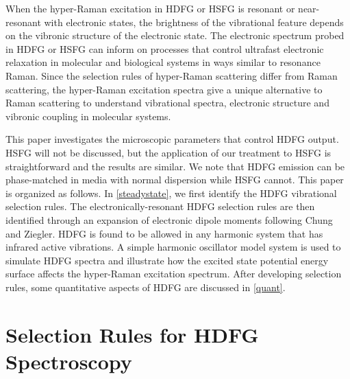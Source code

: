 \documentclass[aip, jcp, reprint, onecolumn, nofootinbib]{revtex4-2}
\begin{document}
When the hyper-Raman excitation in HDFG or HSFG is resonant or near-resonant with electronic states, the brightness of the vibrational feature depends on the vibronic structure of the electronic state.
The electronic spectrum probed in HDFG or HSFG can inform on processes that control ultrafast electronic relaxation in molecular and biological systems in ways similar to resonance Raman.\cite{Cho2001, Bredenbeck2015, Gaynor2018, Arsenault2021}
Since the selection rules of hyper-Raman scattering differ from Raman scattering, the hyper-Raman excitation spectra give a unique alternative to Raman scattering to understand vibrational spectra, electronic structure and vibronic coupling in molecular systems. \cite{Olson2018}

This paper investigates the microscopic parameters that control HDFG output. \cite{RN352, Bonn2024, McDonnell2024}
HSFG will not be discussed, but the application of our treatment to HSFG is straightforward and the results are similar.
We note that HDFG emission can be phase-matched in media with normal dispersion while HSFG cannot.\cite{RN279, RN278} 
This paper is organized as follows.
In \autoref{steadystate}, we first identify the HDFG vibrational selection rules. 
The electronically-resonant HDFG selection rules are then identified through an expansion of electronic dipole moments following Chung and Ziegler.\cite{Ziegler1988}
HDFG is found to be allowed in any harmonic system that has infrared active vibrations.
A simple harmonic oscillator model system is used to simulate HDFG spectra and illustrate how the excited state potential energy surface affects the hyper-Raman excitation spectrum.
After developing selection rules, some quantitative aspects of HDFG are discussed in \autoref{quant}.

\section{Selection Rules for HDFG Spectroscopy}\label{steadystate}
\end{document}
